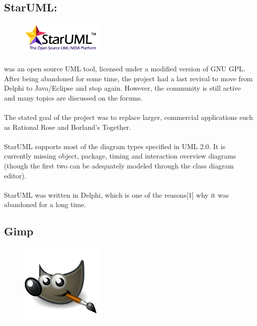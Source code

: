 \subsection{StarUML:}
\begin{figure}
\includegraphics[width=4cm]{./images/implementation/StarUML}
\end{figure}
\paragraph{}was an open source UML tool, licensed under a modified version of GNU GPL. After being abandoned for some time, 
the project had a last revival to move from Delphi to Java/Eclipse and stop again. However, 
the community is still active and many topics are discussed on the forums.\par
\paragraph{}The stated goal of the project was to replace larger, commercial applications such as Rational Rose and Borland's Together.\par
\paragraph{}StarUML supports most of the diagram types specified in UML 2.0. It is currently missing object, package, 
timing and interaction overview diagrams (though the first two can be adequately modeled through the class diagram editor).\par

\paragraph{} StarUML was written in Delphi, which is one of the reasons[1] why it was abandoned for a long time.\par

\subsection{Gimp}
\begin{figure}
\includegraphics[width=4cm]{./images/implementation/gimp}
\end{figure}
